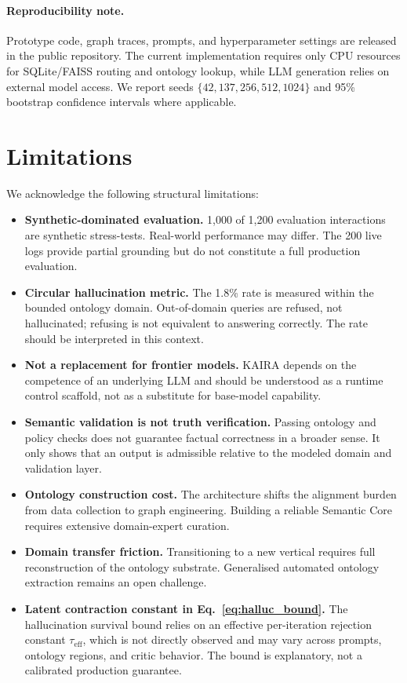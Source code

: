 \documentclass[11pt,a4paper]{article}
\begin{document}
\paragraph{Reproducibility note.}
Prototype code, graph traces, prompts, and hyperparameter settings are released in the public repository. The current implementation requires only CPU resources for SQLite/FAISS routing and ontology lookup, while LLM generation relies on external model access. We report seeds $\{42,137,256,512,1024\}$ and 95\% bootstrap confidence intervals where applicable.

\section{Limitations}
We acknowledge the following structural limitations:
\begin{itemize}
    \item \textbf{Synthetic-dominated evaluation.} 1,000 of 1,200 evaluation interactions are synthetic stress-tests. Real-world performance may differ. The 200 live logs provide partial grounding but do not constitute a full production evaluation.
    \item \textbf{Circular hallucination metric.} The 1.8\% rate is measured within the bounded ontology domain. Out-of-domain queries are refused, not hallucinated; refusing is not equivalent to answering correctly. The rate should be interpreted in this context.
    \item \textbf{Not a replacement for frontier models.} KAIRA depends on the competence of an underlying LLM and should be understood as a runtime control scaffold, not as a substitute for base-model capability.
    \item \textbf{Semantic validation is not truth verification.} Passing ontology and policy checks does not guarantee factual correctness in a broader sense. It only shows that an output is admissible relative to the modeled domain and validation layer.
    \item \textbf{Ontology construction cost.} The architecture shifts the alignment burden from data collection to graph engineering. Building a reliable Semantic Core requires extensive domain-expert curation.
    \item \textbf{Domain transfer friction.} Transitioning to a new vertical requires full reconstruction of the ontology substrate. Generalised automated ontology extraction remains an open challenge.
    \item \textbf{Latent contraction constant in Eq.~\ref{eq:halluc_bound}.} The hallucination survival bound relies on an effective per-iteration rejection constant $\tau_{\mathrm{eff}}$, which is not directly observed and may vary across prompts, ontology regions, and critic behavior. The bound is explanatory, not a calibrated production guarantee.

\end{itemize}
\end{document}
